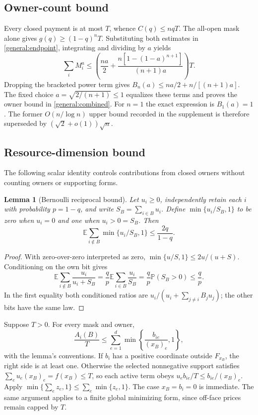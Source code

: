 \documentclass[11pt]{article}
\newtheorem{lemma}[theorem]{Lemma}
\theoremstyle{definition}\newtheorem{definition}[theorem]{Definition}
\theoremstyle{remark}\newtheorem{remark}[theorem]{Remark}
\newcommand{\E}{\mathbb E}
\newcommand{\Prob}{\mathbb P}
\begin{document}
\subsection{Owner-count bound}
Every closed payment is at most $T$, whence $C(q)\le nqT$.
The all-open mask alone gives $g(q)\ge(1-q)^nT$.
Substituting both estimates in \eqref{general:endpoint}, integrating and
dividing by $a$ yields
\[
 \sum_i M_i^a\le\left(\frac{na}{2}+
 \frac{n[1-(1-a)^{n+1}]}{(n+1)a}\right)T.
\]
Dropping the bracketed power term gives
$B_n(a)\le na/2+n/[(n+1)a]$. The fixed choice
$a=\sqrt{2/(n+1)}\le1$ equalizes these terms and proves the owner bound
in \eqref{general:combined}. For $n=1$ the exact expression is $B_1(a)=1$.
The former $O(n/\log n)$ upper bound recorded in the supplement is therefore
superseded by $(\sqrt2+o(1))\sqrt n$.

\subsection{Resource-dimension bound}
The following scalar identity controls contributions from closed owners
without counting owners or supporting forms.
\begin{lemma}[Bernoulli reciprocal bound]\label{general:reciprocal}
Let $u_i\ge0$, independently retain each $i$ with probability $p=1-q$, and
write $S_B=\sum_{i\in B}u_i$. Define $\min\{u_i/S_B,1\}$ to be zero when
$u_i=0$ and one when $u_i>0=S_B$. Then
\[
 \E\sum_{i\notin B}\min\{u_i/S_B,1\}\le\frac{2q}{1-q}.
\]
\end{lemma}
\begin{proof}
With zero-over-zero interpreted as zero,
$\min\{u/S,1\}\le2u/(u+S)$. Conditioning on the own bit gives
\[
 \E\sum_{i\notin B}\frac{u_i}{u_i+S_B}
 =\frac qp\E\sum_{i\in B}\frac{u_i}{S_B}
 =\frac qp\Prob(S_B>0)\le\frac qp.
\]
In the first equality both conditioned ratios are
$u_i/(u_i+\sum_{j\ne i}B_ju_j)$; the other bits have the same law.
\end{proof}

Suppose $T>0$. For every mask and owner,
\begin{equation}\label{general:coordinate}
 \frac{A_i(B)}T\le
 \sum_{e=1}^d\min\left\{\frac{b_{ie}}{(x_B)_e},1\right\},
\end{equation}
with the lemma's conventions. If $b_i$ has a positive coordinate outside
$F_{x_B}$, the right side is at least one. Otherwise the selected nonnegative
support satisfies $\sum_eu_e(x_B)_e=f(x_B)\le T$, so each active term obeys
$u_eb_{ie}/T\le b_{ie}/(x_B)_e$. Apply
$\min\{\sum_e z_e,1\}\le\sum_e\min\{z_e,1\}$.
The case $x_B=b_i=0$ is immediate. The same argument applies to a finite
global minimizing form, since off-face prices remain capped by $T$.
\end{document}
